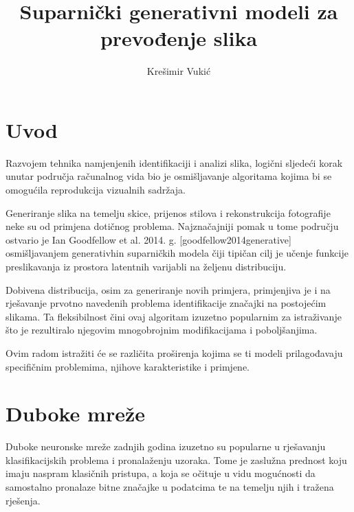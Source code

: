 \documentclass[lmodern, utf8, seminar]{fer}
\begin{document}
\nocite{*}



\title{Suparnički generativni modeli za prevođenje slika}

\author{Krešimir Vukić}

\maketitle


\tableofcontents



\chapter{Uvod}
Razvojem tehnika namjenjenih identifikaciji i analizi slika, logični sljedeći korak unutar područja računalnog vida bio je osmišljavanje algoritama kojima bi se omogućila reprodukcija vizualnih sadržaja. 
\newline

Generiranje slika na temelju skice, prijenos stilova i rekonstrukcija fotografije neke su od primjena dotičnog problema. Najznačajniji pomak u tome području ostvario je Ian Goodfellow et al. 2014. g. [goodfellow2014generative] osmišljavanjem generativhin suparničkih modela čiji tipičan cilj je učenje funkcije preslikavanja iz prostora latentnih varijabli na željenu distribuciju.

Dobivena distribucija, osim za generiranje novih primjera, primjenjiva je i na rješavanje prvotno navedenih problema identifikacije značajki na postojećim slikama. Ta fleksibilnost čini ovaj algoritam izuzetno popularnim za istraživanje što je rezultiralo njegovim mnogobrojnim modifikacijama i poboljšanjima.
\newline

Ovim radom istražiti će se različita proširenja kojima se ti modeli prilagođavaju specifičnim problemima, njihove karakteristike i primjene.

\chapter{Duboke mreže}
Duboke neuronske mreže zadnjih godina izuzetno su popularne u rješavanju klasifikacijskih problema i pronalaženju uzoraka. Tome je zaslužna prednost koju imaju naspram klasičnih pristupa, a koja se očituje u vidu mogućnosti da samostalno pronalaze bitne značajke u podatcima te na temelju njih i tražena rješenja.
\end{document}

